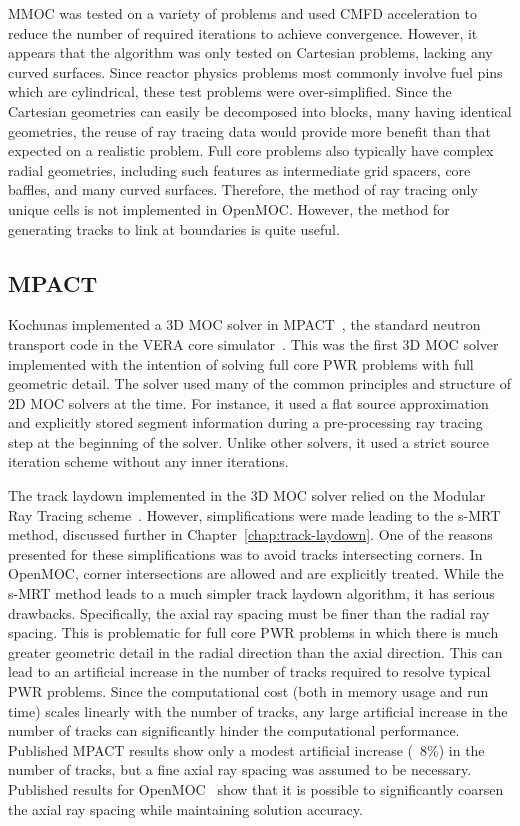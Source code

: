 MMOC was tested on a variety of problems and used \ac{CMFD} acceleration to reduce the number of required iterations to achieve convergence.  However, it appears that the algorithm was only tested on Cartesian problems, lacking any curved surfaces. Since reactor physics problems most commonly involve fuel pins which are cylindrical, these test problems were over-simplified. Since the Cartesian geometries can easily be decomposed into blocks, many having identical geometries, the reuse of ray tracing data would provide more benefit than that expected on a realistic problem. Full core problems also typically have complex radial geometries, including such features as intermediate grid spacers, core baffles, and many curved surfaces. Therefore, the method of ray tracing only unique cells is not implemented in OpenMOC. However, the method for generating tracks to link at boundaries is quite useful.

\subsection{MPACT}
\label{sec:mpact}

Kochunas implemented a 3D \ac{MOC} solver in MPACT~\cite{mpact_initial, kochunas}, the standard neutron transport code in the VERA core simulator~\cite{vera}.  This was the first 3D \ac{MOC} solver implemented with the intention of solving full core PWR problems with full geometric detail. The solver used many of the common principles and structure of 2D \ac{MOC} solvers at the time. For instance, it used a flat source approximation and explicitly stored segment information during a pre-processing ray tracing step at the beginning of the solver. Unlike other solvers, it used a strict source iteration scheme without any inner iterations. 

The track laydown implemented in the 3D \ac{MOC} solver relied on the Modular Ray Tracing scheme~\cite{liu_mrt}. However, simplifications were made leading to the s-MRT method, discussed further in Chapter~\ref{chap:track-laydown}. One of the reasons presented for these simplifications was to avoid tracks intersecting corners. In OpenMOC, corner intersections are allowed and are explicitly treated. While the s-MRT method leads to a much simpler track laydown algorithm, it has serious drawbacks. Specifically, the axial ray spacing must be finer than the radial ray spacing. This is problematic for full core \ac{PWR} problems in which there is much greater geometric detail in the radial direction than the axial direction. This can lead to an artificial increase in the number of tracks required to resolve typical \ac{PWR} problems. Since the computational cost (both in memory usage and run time) scales linearly with the number of tracks, any large artificial increase in the number of tracks can significantly hinder the computational performance. Published MPACT results show only a modest artificial increase (~8\%) in the number of tracks, but a fine axial ray spacing was assumed to be necessary. Published results for OpenMOC~\cite{shaner-laydown, openmoc-beavrs} show that it is possible to significantly coarsen the axial ray spacing while maintaining solution accuracy.

